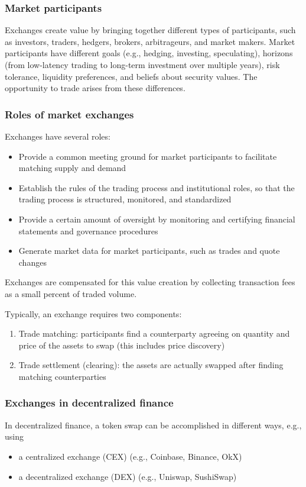 \documentclass[11pt, reqno]{amsart}
\theoremstyle{definition}
\theoremstyle{remark}
\begin{document}
\subsubsection{Market participants}
Exchanges create value by bringing together different types of participants,
such as investors, traders, hedgers, brokers, arbitrageurs, and market makers.
Market participants have different goals (e.g., hedging, investing,
speculating), horizons (from low-latency trading to long-term investment over
multiple years), risk tolerance, liquidity preferences, and beliefs about
security values. The opportunity to trade arises from these differences.

\subsubsection{Roles of market exchanges}

Exchanges have several roles:
\begin{itemize}
    \item Provide a common meeting ground for market participants to
          facilitate matching supply and demand
    \item Establish the rules of the trading process and institutional roles, so
          that the trading process is structured, monitored, and standardized
    \item Provide a certain amount of oversight by monitoring and certifying
          financial statements and governance procedures
    \item Generate market data for market participants, such as trades and
          quote changes
\end{itemize}

Exchanges are compensated for this value creation by collecting transaction
fees as a small percent of traded volume.

Typically, an exchange requires two components:
\begin{enumerate}
    \item Trade matching: participants find a counterparty agreeing on quantity
          and price of the assets to swap (this includes price discovery)
    \item Trade settlement (clearing): the assets are actually swapped after
          finding matching counterparties
\end{enumerate}

\subsubsection{Exchanges in decentralized finance}
In decentralized finance, a token swap can be accomplished in different ways,
e.g., using
\begin{itemize}
    \item a centralized exchange (CEX) (e.g., Coinbase, Binance, OkX)
    \item a decentralized exchange (DEX) (e.g., Uniswap, SushiSwap)
\end{itemize}
\end{document}

